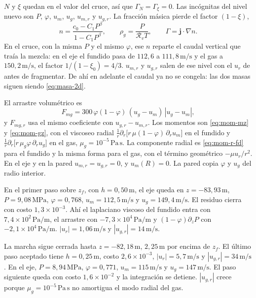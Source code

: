 \documentclass[11pt,a4paper]{article}
\newcommand{\Rv}{\mathcal{R}_v}
\begin{document}
\(N\) y \(\xi\) quedan en el valor del cruce, así que
\(\Gamma_N=\Gamma_\xi=0\). Las incógnitas del nivel nuevo son
\(P\), \(\varphi\), \(u_m\), \(u_g\), \(u_{m,r}\) y \(u_{g,r}\).
La fracción másica pierde el factor \((1-\xi)\),
\begin{equation}
\label{eq:n-sinxi}
n=\frac{c_0-C_1 P^{\beta}}{1-C_1 P^{\beta}},
\qquad
\rho_g=\frac{P}{\Rv T},
\qquad
\Gamma=\mathbf{j}\cdot\nabla n.
\end{equation}
En el cruce, con la misma \(P\) y el mismo \(\varphi\), ese \(n\)
reparte el caudal vertical que traía la mezcla: en el eje el fundido
pasa de \(112{,}6\) a \(111{,}8\,\mathrm{m/s}\) y el gas a
\(150{,}2\,\mathrm{m/s}\), el factor \(1/(1-\xi_0)=4/3\).
\(u_{m,r}\) y \(u_{g,r}\) salen de ese nivel con el \(u_r\) de antes
de fragmentar.
De ahí en adelante el caudal ya no se congela: las dos masas siguen
siendo \eqref{eq:masa-2d}.

El arrastre volumétrico es
\begin{equation}
\label{eq:Fmg-frag}
F_{mg}=300\,\varphi(1-\varphi)\,(u_g-u_m)\,|u_g-u_m|,
\end{equation}
y \(F_{mg,r}\) usa el mismo coeficiente con \(u_{g,r}-u_{m,r}\).
Los momentos son \eqref{eq:mom-mz} y \eqref{eq:mom-gz}, con el
viscoseo radial
\(\frac1r\partial_r\bigl[r\,\mu(1-\varphi)\,\partial_r u_m\bigr]\)
en el fundido y
\(\frac1r\partial_r\bigl[r\,\mu_g\varphi\,\partial_r u_g\bigr]\)
en el gas, \(\mu_g=10^{-5}\,\mathrm{Pa\,s}\). La componente radial
es \eqref{eq:mom-r-fd} para el fundido y la misma forma para el gas,
con el término geométrico \(-\mu u_r/r^2\). En el eje y en la pared
\(u_{m,r}=u_{g,r}=0\), y \(u_m(R)=0\). La pared copia \(\varphi\) y
\(u_g\) del radio interior.

En el primer paso sobre \(z_f\), con \(h=0{,}50\,\mathrm{m}\), el eje
queda en \(z=-83{,}93\,\mathrm{m}\), \(P=9{,}08\,\mathrm{MPa}\),
\(\varphi=0{,}768\), \(u_m=112{,}5\,\mathrm{m/s}\) y
\(u_g=149{,}4\,\mathrm{m/s}\). El residuo cierra con costo
\(1{,}3\times 10^{-3}\). Ahí el laplaciano viscoso del fundido entra
con \(7{,}4\times 10^{2}\,\mathrm{Pa/m}\), el arrastre con
\(-7{,}3\times 10^{4}\,\mathrm{Pa/m}\) y
\((1-\varphi)\partial_z P\) con \(-2{,}1\times 10^{4}\,\mathrm{Pa/m}\).
\(|u_r|=1{,}06\,\mathrm{m/s}\) y \(|u_{g,r}|=14\,\mathrm{m/s}\).

La marcha sigue cerrada hasta \(z=-82{,}18\,\mathrm{m}\),
\(2{,}25\,\mathrm{m}\) por encima de \(z_f\). El último paso aceptado
tiene \(h=0{,}25\,\mathrm{m}\), costo \(2{,}6\times 10^{-3}\),
\(|u_r|=5{,}7\,\mathrm{m/s}\) y \(|u_{g,r}|=34\,\mathrm{m/s}\). En el
eje, \(P=8{,}94\,\mathrm{MPa}\), \(\varphi=0{,}771\),
\(u_m=115\,\mathrm{m/s}\) y \(u_g=147\,\mathrm{m/s}\). El paso
siguiente queda con costo \(1{,}6\times 10^{-2}\) y la integración se
detiene. \(|u_{g,r}|\) crece porque
\(\mu_g=10^{-5}\,\mathrm{Pa\,s}\) no amortigua el modo radial del gas.
\end{document}
